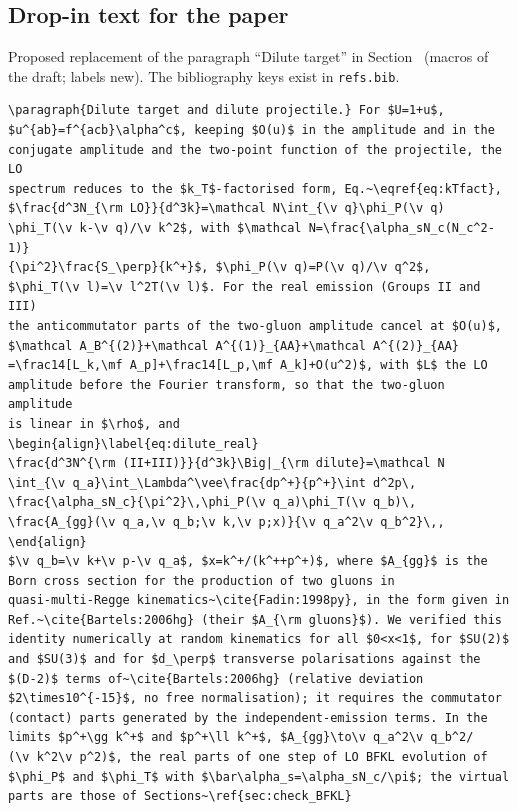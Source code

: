 \subsection{Drop-in text for the paper}
Proposed replacement of the paragraph ``Dilute target'' in Section~ (macros of the draft; labels new). The bibliography keys exist in \texttt{refs.bib}.
\begin{verbatim}
\paragraph{Dilute target and dilute projectile.} For $U=1+u$,
$u^{ab}=f^{acb}\alpha^c$, keeping $O(u)$ in the amplitude and in the
conjugate amplitude and the two-point function of the projectile, the LO
spectrum reduces to the $k_T$-factorised form, Eq.~\eqref{eq:kTfact},
$\frac{d^3N_{\rm LO}}{d^3k}=\mathcal N\int_{\v q}\phi_P(\v q)
\phi_T(\v k-\v q)/\v k^2$, with $\mathcal N=\frac{\alpha_sN_c(N_c^2-1)}
{\pi^2}\frac{S_\perp}{k^+}$, $\phi_P(\v q)=P(\v q)/\v q^2$,
$\phi_T(\v l)=\v l^2T(\v l)$. For the real emission (Groups II and III)
the anticommutator parts of the two-gluon amplitude cancel at $O(u)$,
$\mathcal A_B^{(2)}+\mathcal A^{(1)}_{AA}+\mathcal A^{(2)}_{AA}
=\frac14[L_k,\mf A_p]+\frac14[L_p,\mf A_k]+O(u^2)$, with $L$ the LO
amplitude before the Fourier transform, so that the two-gluon amplitude
is linear in $\rho$, and
\begin{align}\label{eq:dilute_real}
\frac{d^3N^{\rm (II+III)}}{d^3k}\Big|_{\rm dilute}=\mathcal N
\int_{\v q_a}\int_\Lambda^\vee\frac{dp^+}{p^+}\int d^2p\,
\frac{\alpha_sN_c}{\pi^2}\,\phi_P(\v q_a)\phi_T(\v q_b)\,
\frac{A_{gg}(\v q_a,\v q_b;\v k,\v p;x)}{\v q_a^2\v q_b^2}\,,
\end{align}
$\v q_b=\v k+\v p-\v q_a$, $x=k^+/(k^++p^+)$, where $A_{gg}$ is the
Born cross section for the production of two gluons in
quasi-multi-Regge kinematics~\cite{Fadin:1998py}, in the form given in
Ref.~\cite{Bartels:2006hg} (their $A_{\rm gluons}$). We verified this
identity numerically at random kinematics for all $0<x<1$, for $SU(2)$
and $SU(3)$ and for $d_\perp$ transverse polarisations against the
$(D-2)$ terms of~\cite{Bartels:2006hg} (relative deviation
$2\times10^{-15}$, no free normalisation); it requires the commutator
(contact) parts generated by the independent-emission terms. In the
limits $p^+\gg k^+$ and $p^+\ll k^+$, $A_{gg}\to\v q_a^2\v q_b^2/
(\v k^2\v p^2)$, the real parts of one step of LO BFKL evolution of
$\phi_P$ and $\phi_T$ with $\bar\alpha_s=\alpha_sN_c/\pi$; the virtual
parts are those of Sections~\ref{sec:check_BFKL}

\end{verbatim}
